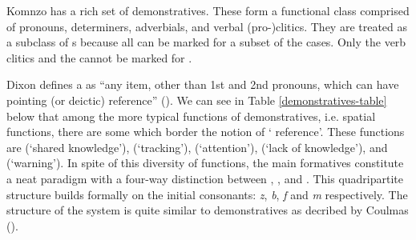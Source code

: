 Komnzo has a rich set of demonstratives. These form a functional class comprised of pronouns, determiners, adverbials, and verbal (pro-)clitics. They are treated as a subclass of s because all can be marked for a subset of the cases. Only the verb clitics and the   cannot be marked for .%

Dixon defines a  as ``any item, other than 1st and 2nd pronouns, which can have pointing (or deictic) reference'' (\citeyear[61-62]{Dixon:2003dj}). We can see in Table \ref{demonstratives-table} below that among the more typical functions of demonstratives, i.e. spatial functions, there are some which border the notion of ` reference'. These functions are  (`shared knowledge'),  (`tracking'),  (`attention'),  (`lack of knowledge'), and  (`warning'). In spite of this diversity of functions, the main formatives constitute a neat paradigm with a four-way distinction between , ,  and . This quadripartite structure builds formally on the initial consonants: \emph{z}, \emph{b}, \emph{f} and \emph{m} respectively. The structure of the system is quite similar to  demonstratives as decribed by Coulmas (\citeyear{Coulmas:1982wl}).%

